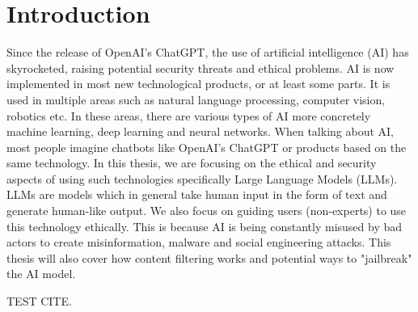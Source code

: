 \chapter{Introduction}


Since the release of OpenAI's ChatGPT, the use of artificial intelligence (AI) has skyrocketed, raising potential security threats and ethical problems. AI is now implemented in most new technological products, or at least some parts. It is used in multiple areas such as natural language processing, computer vision, robotics etc. In these areas, there are various types of AI more concretely machine learning, deep learning and neural networks. When talking about AI, most people imagine chatbots like OpenAI's ChatGPT or products based on the same technology. In this thesis, we are focusing on the ethical and security aspects of using such technologies specifically Large Language Models (LLMs). LLMs are models which in general take human input in the form of text and generate human-like output. We also focus on guiding users (non-experts) to use this technology ethically. This is because AI is being constantly misused by bad actors to create misinformation, malware and social engineering attacks. This thesis will also cover how content filtering works and potential ways to "jailbreak" the AI model.




TEST CITE.\cite{KNOTH2024100225}
